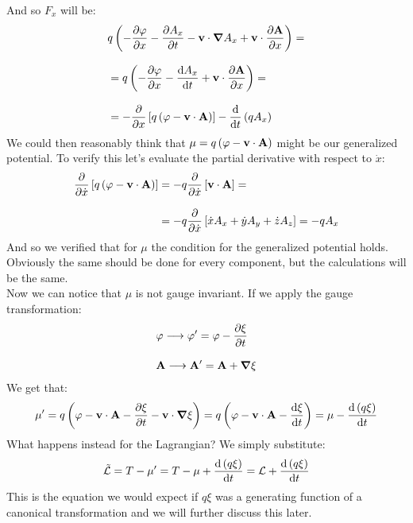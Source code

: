And so $F_x$ will be:
\begin{equation}
  \begin{split}
    &q \brackets{-\pdv{\potE}{x} - \pdv{A_x}{t}  -\vec{v} \cdot \grad{A_x} + \vec{v}\cdot \pdv{\vec{A}}{x}} = \\[8pt]
    &= q \brackets{-\pdv{\potE}{x} - \dv{A_x}{t} + \vec{v}\cdot \pdv{\vec{A}}{x}} = \\[8pt]
    &= -\pdv{}{x}\sqbr{q\brackets{\potE - \vec{v}\cdot \vec{A}}} - \dv{}{t}\brackets{qA_x}
  \end{split}
\end{equation}
We could then reasonably think that $\mu = q\left(\varphi - \vb{v}\cdot \vb{A}\right)$ might be our generalized potential. To verify this let's evaluate the partial derivative with respect to $\dot{x}$:
\begin{equation}
  \begin{split}
    \pdv{}{\dot{x}} \sqbr{q\brackets{\potE - \vec{v}\cdot \vec{A}}} &= -q \pdv{}{\dot{x}} \sqbr{\vec{v} \cdot \vec{A}} = \\[8pt]
    &= -q \pdv{}{\dot{x}} \sqbr{\dot{x} A_x + \dot{y} A_y + \dot{z} A_z} = -q A_x
  \end{split}
\end{equation}
And so we verified that for $\mu$ the condition for the generalized potential holds. Obviously the same should be done for every component, but the calculations will be the same.\\
Now we can notice that $\mu$ is not gauge invariant. If we apply the gauge transformation:
\begin{equation}
  \begin{split}
    &\potE \longrightarrow \potE' = \potE - \pdv{\xi}{t} \\[8pt]
    &\vec{A} \longrightarrow \vec{A}' = \vec{A} + \grad{\xi}
  \end{split}
\end{equation}
We get that:
\begin{equation}
  \mu' = q\brackets{\potE  - \vec{v}\cdot \vec{A} - \pdv{\xi}{t} - \vec{v}\cdot \grad{\xi}} = q\brackets{\potE  - \vec{v}\cdot \vec{A} -\dv{\xi}{t}} = \mu -\dv{\brackets{q\xi}}{t}
\end{equation}
What happens instead for the Lagrangian? We simply substitute:
\begin{equation} \label{e:gauge_lagr}
  \tilde{\lagr} = T - \mu' = T -\mu +\dv{\brackets{q\xi}}{t} = \lagr  +\dv{\brackets{q\xi}}{t}
\end{equation}
This is the equation we would expect if $q\xi$ was a generating function of a canonical transformation and we will further discuss this later.\\
